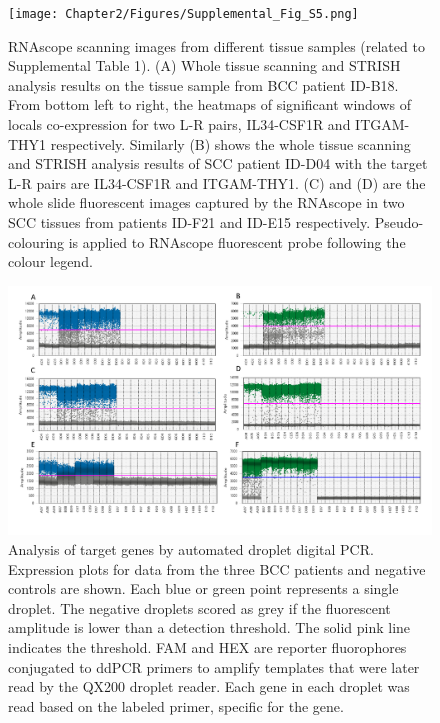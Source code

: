 \begin{figure}[htp]
\renewcommand{\figurename}{Supplementary Figure}
    \centering
    \texttt{[image: Chapter2/Figures/Supplemental\_Fig\_S5.png]}
    \caption[RNAscope scanning images from different tissue samples]{RNAscope scanning images from different tissue samples (related to Supplemental Table 1). (A) Whole tissue scanning and STRISH analysis results on the tissue sample from BCC patient ID-B18. From bottom left to right, the heatmaps of significant windows of locals co-expression for two L-R pairs, IL34-CSF1R and ITGAM-THY1 respectively. Similarly (B) shows the whole tissue scanning and STRISH analysis results of SCC patient ID-D04 with the target L-R pairs are IL34-CSF1R and ITGAM-THY1. (C) and (D) are the whole slide fluorescent images captured by the RNAscope in two SCC tissues from patients ID-F21 and ID-E15 respectively. Pseudo-colouring is applied to RNAscope fluorescent probe following the colour legend.}
    \label{fig:Chap2_Supfigure5}
\end{figure}
\begin{figure}[htp]
\renewcommand{\figurename}{Supplementary Figure}
    \centering
    \includegraphics[width=0.75\columnwidth]{Chapter2/Figures/Supplemental_Fig_S6.png}
    \caption[Analysis of target genes by automated droplet digital PCR.]{Analysis of target genes by automated droplet digital PCR. Expression plots for data from the three BCC patients and negative controls are shown. Each blue or green point represents a single droplet. The negative droplets scored as grey if the fluorescent amplitude is lower than a detection threshold. The solid pink line indicates the threshold. FAM and HEX are reporter fluorophores conjugated to ddPCR primers to amplify templates that were later read by the QX200 droplet reader. Each gene in each droplet was read based on the labeled primer, specific for the gene.  }
    \label{fig:Chap2_Supfigure6}
\end{figure}

